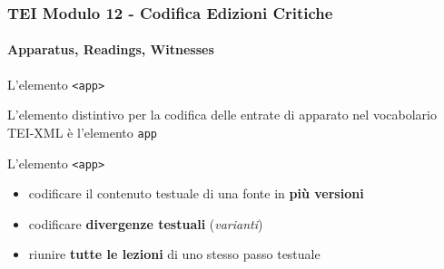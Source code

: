 \begin{frame}
    \frametitle{TEI Modulo 12 - Codifica Edizioni Critiche}
    \framesubtitle{Apparatus, Readings, Witnesses}
    \addtocounter{nframe}{1}










    \begin{block}{L'elemento \texttt{<app>}}

        L'elemento distintivo per la codifica delle entrate di apparato nel vocabolario TEI-XML è l'elemento \texttt{app}

    \end{block}
    \begin{block}{L'elemento \texttt{<app>}}

        \begin{itemize}
            \item codificare il contenuto testuale di una fonte in \textbf{più versioni}
            \item codificare \textbf{divergenze testuali} (\textit{varianti})
            \item riunire \textbf{tutte le lezioni} di uno stesso passo testuale
        \end{itemize}

    \end{block}


\end{frame}


